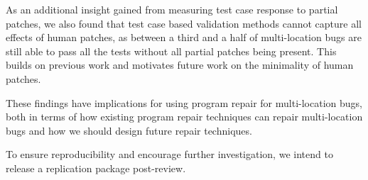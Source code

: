 \documentclass[sigconf, timestamp-false, anonymous=true]{acmart}
\begin{document}
As an additional insight gained from measuring test case response to partial patches, we 
also found that test case based validation methods cannot capture all effects of human 
patches,
as between a third and a half of multi-location bugs are still able to pass all the tests 
without all partial patches being present. This builds on previous work and motivates 
future work on the minimality of human patches.

These findings have implications for using program repair for multi-location bugs, both in 
terms of how existing program repair techniques can repair multi-location bugs and how 
we should design future repair techniques.

To ensure reproducibility and encourage further investigation, we intend to release a 
replication package post-review.



\end{document}
